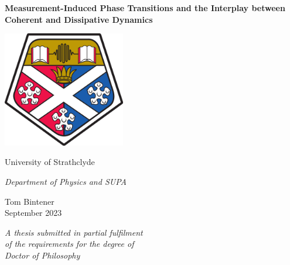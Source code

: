 \pagestyle{empty}
\begin{titlepage}
   \begin{center}
       \vspace*{0.5cm}

       \textbf{\LARGE Measurement-Induced Phase Transitions and the Interplay between Coherent and Dissipative Dynamics}

       \vspace{1.5cm}
            
       \includegraphics[width=0.4\textwidth]{Logos/strath_fullcolour.png}
       
       \LARGE University of Strathclyde 
            
       \textit{\Large Department of Physics and SUPA}\\
       
       \vspace{1.0cm}

       \Large Tom Bintener \\
       \Large{September 2023}

       \vspace{1cm}
       
       \textit{\Large A thesis submitted in partial fulfilment \\ 
		of the requirements for the degree of \\
		Doctor of Philosophy} \\

        \vspace{1cm}
            
   \end{center}
\end{titlepage}
\cleardoublepage 
